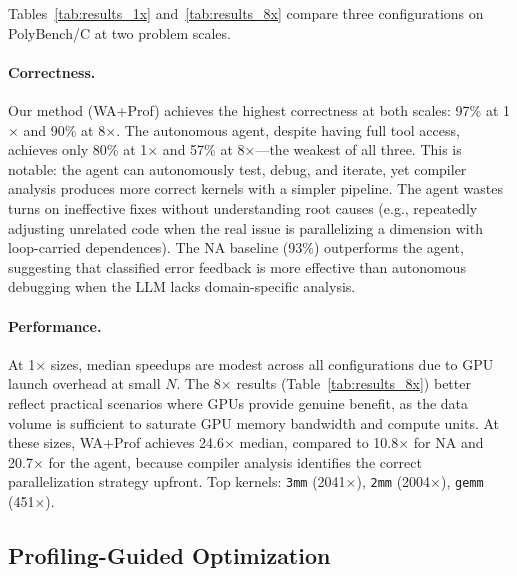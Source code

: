 Tables~\ref{tab:results_1x} and~\ref{tab:results_8x} compare three configurations on PolyBench/C at two problem scales.

\paragraph{Correctness.}
Our method (WA+Prof) achieves the highest correctness at both scales: 97\% at 1$\times$ and 90\% at 8$\times$.
The autonomous agent, despite having full tool access, achieves only 80\% at 1$\times$ and 57\% at 8$\times$---the weakest of all three.
This is notable: the agent can autonomously test, debug, and iterate, yet compiler analysis produces more correct kernels with a simpler pipeline.
The agent wastes turns on ineffective fixes without understanding root causes (e.g., repeatedly adjusting unrelated code when the real issue is parallelizing a dimension with loop-carried dependences).
The NA baseline (93\%) outperforms the agent, suggesting that classified error feedback is more effective than autonomous debugging when the LLM lacks domain-specific analysis.

\paragraph{Performance.}
At 1$\times$ sizes, median speedups are modest across all configurations due to GPU launch overhead at small $N$.
The 8$\times$ results (Table~\ref{tab:results_8x}) better reflect practical scenarios where GPUs provide genuine benefit, as the data volume is sufficient to saturate GPU memory bandwidth and compute units.
At these sizes, WA+Prof achieves 24.6$\times$ median, compared to 10.8$\times$ for NA and 20.7$\times$ for the agent, because compiler analysis identifies the correct parallelization strategy upfront.
Top kernels: \texttt{3mm} (2041$\times$), \texttt{2mm} (2004$\times$), \texttt{gemm} (451$\times$).

\subsection{Profiling-Guided Optimization}

